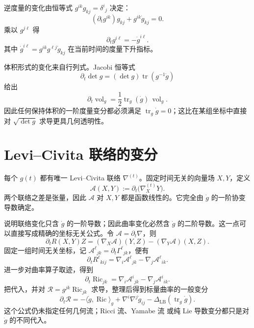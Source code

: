 逆度量的变化由恒等式 $g^{ik}g_{kj}=\delta^i{}_j$ 决定：
\[
(\partial_tg^{ik})g_{kj}+g^{ik}\dot g_{kj}=0.
\]
乘以 $g^{j\ell}$ 得
\begin{equation}\label{eq:math-dg-inverse-metric-variation}
\boxed{\partial_tg^{i\ell}=-\dot g^{i\ell}.}
\end{equation}
其中 $\dot g^{i\ell}=g^{ik}g^{\ell j}\dot g_{kj}$ 在当前时间的度量下升指标。

体积形式的变化来自行列式。Jacobi 恒等式
\[
\partial_t\det g
=(\det g)\operatorname{tr}(g^{-1}\dot g)
\]
给出
\begin{equation}\label{eq:math-dg-volume-variation}
\boxed{
\partial_t\operatorname{vol}_g
=\frac12\operatorname{tr}_g(\dot g)\,\operatorname{vol}_g.}
\end{equation}
因此任何保持体积的一阶度量变分都必须满足 $\operatorname{tr}_g \dot g=0$；这比在某组坐标中直接对 $\sqrt{\det g}$ 求导更具几何透明性。

\section{Levi--Civita 联络的变分}

每个 $g(t)$ 都有唯一 Levi--Civita 联络 $\nabla^{(t)}$。固定时间无关的向量场 $X,Y$，定义
\[
\mathcal A(X,Y)
:=\partial_t\bigl(\nabla^{(t)}_XY\bigr).
\]
两个联络之差是张量，因此 $\mathcal A$ 对 $X,Y$ 都是函数线性的。它完全由 $\dot g$ 的一阶协变导数确定。

说明联络变化只含 $\dot g$ 的一阶导数；因此曲率变化必然含 $\dot g$ 的二阶导数。这一点可以直接写成精确的坐标无关公式。令 $\mathcal A=\partial_t\nabla$，则
\begin{equation}\label{eq:math-dg-curvature-variation-abstract}
\boxed{
\partial_tR(X,Y)Z
=(\nabla_X\mathcal A)(Y,Z)
-(\nabla_Y\mathcal A)(X,Z).}
\end{equation}
固定一组时间无关坐标，记 $\mathcal A^\ell{}_{jk}=\partial_t\Gamma^\ell{}_{jk}$，便有
\[
\partial_tR^\ell{}_{kij}
=\nabla_i\mathcal A^\ell{}_{jk}
-\nabla_j\mathcal A^\ell{}_{ik}.
\]
进一步对曲率算子取迹，得到
\begin{equation}\label{eq:math-dg-ricci-variation}
\partial_t\operatorname{Ric}_{jk}
=\nabla_i\mathcal A^i{}_{jk}
-\nabla_j\mathcal A^i{}_{ik}.
\end{equation}
把代入，并对 $\mathcal R=g^{jk}\operatorname{Ric}_{jk}$ 求导，整理后得到标量曲率的一般变分
\begin{equation}\label{eq:math-dg-scalar-curvature-variation}
\boxed{
\partial_t\mathcal R
=-\langle\dot g,\operatorname{Ric}\rangle_g
+\nabla^i\nabla^j\dot g_{ij}
-\Delta_{\mathrm{LB}}(\operatorname{tr}_g\dot g).}
\end{equation}
这个公式仍未指定任何几何流；Ricci 流、Yamabe 流 或纯 Lie 导数变分都只是对 $\dot g$ 的不同代入。

